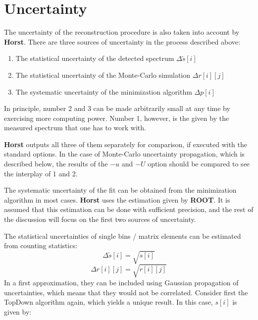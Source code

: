 \documentclass{article}
\begin{document}
\section{Uncertainty}
\label{Uncertainty}

The uncertainty of the reconstruction procedure is also taken into account by \textbf{Horst}.
There are three sources of uncertainty in the process described above:

\begin{enumerate}
	\item The statistical uncertainty of the detected spectrum $\Delta \tilde{s}[i]$
	\item The statistical uncertainty of the Monte-Carlo simulation $\Delta r[i][j]$
	\item The systematic uncertainty of the minimization algorithm $\Delta p[i]$
\end{enumerate}

In principle, number 2 and 3 can be made arbitrarily small at any time by exercising more computing power. 
Number 1, however, is the given by the measured spectrum that one has to work with.

\textbf{Horst} outputs all three of them separately for comparison, if executed with the standard options.
In the case of Monte-Carlo uncertainty propagation, which is described below, the results of the $-u$ and $-U$ option should be compared to see the interplay of 1 and 2.

The systematic uncertainty of the fit can be obtained from the minimization algorithm in most cases.
\textbf{Horst} uses the estimation given by \textbf{ROOT}.
It is assumed that this estimation can be done with sufficient precision, and the rest of the discussion will focus on the first two sources of uncertainty.

The statistical uncertainties of single bins / matrix elements can be estimated from counting statistics:
%
\begin{equation}
	\label{spectrum_uncertainty}
	\Delta \tilde{s} [i] = \sqrt{ s[i] }
\end{equation}
\begin{equation}
	\label{simulation_uncertainty}
	\Delta r [i][j] = \sqrt{ r[i][j] }
\end{equation}
%
In a first approximation, they can be included using Gaussian propagation of uncertainties, which means that they would not be correlated.
Consider first the TopDown algorithm again, which yields a unique result.
In this case, $s[i]$ is given by:
%
%
\end{document}
